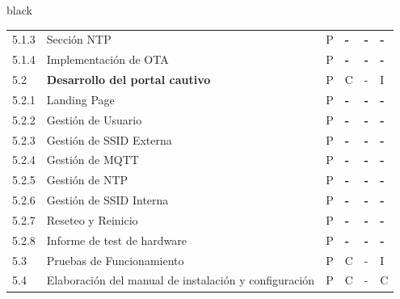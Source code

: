 \documentclass[11pt]{charter}
\begin{document}
\begin{consigna}{black}
\begin{tabularx}{\linewidth}{@{}|p{1.3cm}|p{10cm}|p{3cm}|p{3cm}|p{3cm}|p{3cm}|@{}}
5.1.3                  & Sección NTP                                                                                   & P          & \textbf{-} & \textbf{-} & \textbf{-} \\
5.1.4                  & Implementación de OTA                                                                         & P          & \textbf{-} & \textbf{-} & \textbf{-} \\
5.2                    & \textbf{Desarrollo del portal cautivo}                                                        & P          & C          & -          & I          \\
5.2.1                  & Landing Page                                                                                  & P          & \textbf{-} & \textbf{-} & \textbf{-} \\
5.2.2                  & Gestión de Usuario                                                                            & P          & \textbf{-} & \textbf{-} & \textbf{-} \\
5.2.3                  & Gestión de SSID Externa                                                                       & P          & \textbf{-} & \textbf{-} & \textbf{-} \\
5.2.4                  & Gestión de MQTT                                                                               & P          & \textbf{-} & \textbf{-} & \textbf{-} \\
5.2.5                  & Gestión de NTP                                                                                & P          & \textbf{-} & \textbf{-} & \textbf{-} \\
5.2.6                  & Gestión de SSID Interna                                                                       & P          & \textbf{-} & \textbf{-} & \textbf{-} \\
5.2.7                  & Reseteo y Reinicio                                                                            & P          & \textbf{-} & \textbf{-} & \textbf{-} \\
5.2.8                  & Informe de test de hardware                                                                   & P          & \textbf{-} & \textbf{-} & \textbf{-} \\
5.3                    & Pruebas de Funcionamiento                                                                     & P          & C          & -          & I          \\
5.4                    & Elaboración del manual de   instalación y configuración                                       & P          & C          & -          & C          \\

\end{tabularx}
\end{consigna}
\end{document}
